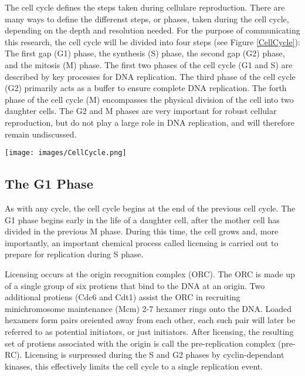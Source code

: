 	The cell cycle defines the steps taken during cellulare reproduction.
	There are many ways to define the differenst steps, or phases, taken during the cell cycle, depending on the depth and resolution needed.
	For the purpose of communicating this research, the cell cycle will be divided into four steps (see Figure \ref{CellCycle}):
	The first gap (G1) phase, the synthesis (S) phase, the second gap (G2) phase, and the mitosis (M) phase.
	The first two phases of the cell cycle (G1 and S) are described by key processes for DNA replication.
	The third phase of the cell cycle (G2) primarily acts as a buffer to ensure complete DNA replication.
	The forth phase of the cell cycle (M) encompasses the physical division of the cell into two daughter cells.
	The G2 and M phases are very important for robust cellular reproduction, but do not play a large role in DNA replication, and will therefore remain undiscussed.
	
	\begin{SCfigure}[1][thb]
		\texttt{[image: images/CellCycle.png]}
		\caption[Cell Cycle]{\label{CellCycle} The complete cell cycle is made up of four phases: 
			The Mitosis (M) phase, when a mother cell separates into two daughter cells. 
			The first Gap (G1) phase, when the daughter cell undergoes growth and chemical preperation for DNA replication.
			The Synthesis (S) phase, when the DNA is replicated.
			And the second Gap (G2) phase which acts as a buffer to ensure complete replication before the M phase.}
	\end{SCfigure}
	
		\subsection{The G1 Phase}
		
		As with any cycle, the cell cycle begins at the end of the previous cell cycle.
		The G1 phase begins early in the life of a daughter cell, after the mother cell has divided in the previous M phase.
		During this time, the cell grows and, more importantly, an important chemical process called licensing is carried out to prepare for replication during S phase.
		
		Licensing occurs at the origin recognition complex (ORC).
		The ORC is made up of a single group of six protiens that bind to the DNA at an origin.
		Two additional protiens (Cdc6 and Cdt1) assist the ORC in recruiting minichromosome maintenance (Mcm) 2-7 hexamer rings onto the DNA.
		Loaded hexamers form pairs oreiented away from each other, each such pair will later be referred to as potential initiators, or just initiators.
		After licensing, the resulting set of protiens associated with the origin is call the pre-replication complex (pre-RC).
		Licensing is surpressed during the S and G2 phases by cyclin-dependant kinases, this effectively limits the cell cycle to a single replication event. \cite{MolecularCellBiology}
		
